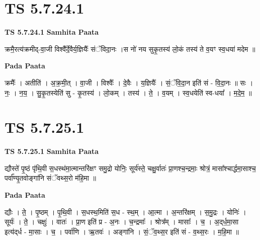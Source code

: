 \documentclass[17pt]{extarticle}
\begin{document}
\section*{ TS 5.7.24.1 }

\textbf{TS 5.7.24.1 } \newline
\textbf{Samhita Paata} \newline

क्रमै॒रत्य॑क्रमीद्-वा॒जी विश्वै᳚र्दे॒वैर्य॒ज्ञियैः᳚ संॅविदा॒नः ।स नो॑ नय सुकृ॒तस्य॑ लो॒कं तस्य॑ ते व॒यꣳ स्व॒धया॑ मदेम ॥ \newline

\textbf{Pada Paata} \newline

क्रमैः᳚ । अतीति॑ । अ॒क्र॒मी॒त् । वा॒जी । विश्वैः᳚ । दे॒वैः । य॒ज्ञियैः᳚ । सं॒ॅवि॒दा॒न इति॑ सं - वि॒दा॒नः ॥ सः । नः॒ । न॒य॒ । सु॒कृ॒तस्येति॑ सु - कृ॒तस्य॑ । लो॒कम् । तस्य॑ । ते॒ । व॒यम् । स्व॒धयेति॑ स्व-धया᳚ । म॒दे॒म॒ ॥  \newline




\section*{ TS 5.7.25.1 }

\textbf{TS 5.7.25.1 } \newline
\textbf{Samhita Paata} \newline

द्यौस्ते॑ पृ॒ष्ठं पृ॑थि॒वी स॒धस्थ॑मा॒त्मान्तरि॑क्षꣳ समु॒द्रो योनिः॒ सूर्य॑स्ते॒ चक्षु॒र्वातः॑ प्रा॒णश्च॒न्द्रमाः॒ श्रोत्रं॒ मासा᳚श्चार्द्धमा॒साश्च॒ पर्वा᳚ण्यृ॒तवोङ्गा॑नि संॅवथ्स॒रो म॑हि॒मा ॥ \newline

\textbf{Pada Paata} \newline

द्यौः । ते॒ । पृ॒ष्ठम् । पृ॒थि॒वी । स॒धस्थ॒मिति॑ स॒ध - स्थ॒म् । आ॒त्मा । अ॒न्तरि॑क्षम् । स॒मु॒द्रः । योनिः॑ । सूर्यः॑ । ते॒ । चक्षुः॑ । वातः॑ । प्रा॒ण इति॑ प्र - अ॒नः । च॒न्द्रमाः᳚ । श्रोत्र᳚म् । मासाः᳚ । च॒ । अ॒द्‌र्ध॒मा॒सा इत्य॑द्‌र्ध - मा॒साः । च॒ । पर्वा॑णि । ऋ॒तवः॑ । अङ्गा॑नि । सं॒ॅव॒थ्स॒र इति॑ सं - व॒थ्स॒रः । म॒हि॒मा ॥  \newline




\end{document}
